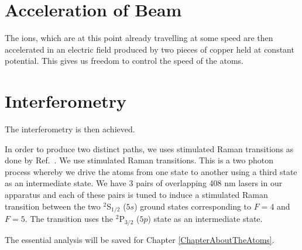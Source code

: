 \section{Acceleration of Beam}

The ions, which are at this point already travelling at some speed are then accelerated in an electric field produced by two pieces of copper held at constant potential. This gives us freedom to control the speed of the atoms. 


\section{Interferometry}

The interferometry is then achieved. 


In order to produce two distinct paths, we uses stimulated Raman transitions as done by Ref.\ \cite{kasevichChu1991}. We use stimulated Raman transitions. This is a two photon process whereby we drive the atoms from one state to another using a third state as an intermediate state. We have 3 pairs of overlapping 408 nm lasers in our apparatus and each of these pairs is tuned to induce a stimulated Raman transition between the two $^2$S$_{1/2}$ ($5s$) ground states corresponding to $F=4$ and $F=5$. The transition uses the $^2$P$_{3/2}$ ($5p$) state as an intermediate state. 


The essential analysis will be saved for Chapter \ref{ChapterAboutTheAtoms}.




